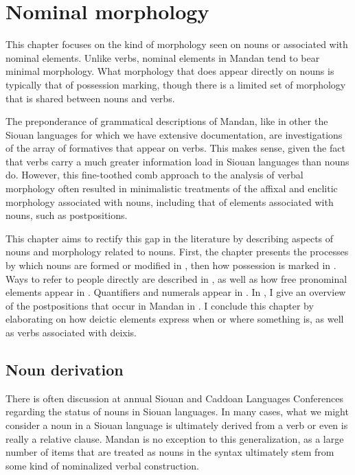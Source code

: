 \chapter{Nominal morphology}\label{chapter4}

This chapter focuses on the kind of morphology seen on nouns or associated with nominal elements. Unlike verbs, nominal elements in Mandan tend to bear minimal morphology. What morphology that does appear directly on nouns is typically that of possession marking, though there is a limited set of morphology that is shared between nouns and verbs.

The preponderance of grammatical descriptions of Mandan, like in other the Siouan languages for which we have extensive documentation, are investigations of the array of formatives that appear on verbs. This makes sense, given the fact that verbs carry a much greater information load in Siouan languages than nouns do. However, this fine-toothed comb approach to the analysis of verbal morphology often resulted in minimalistic treatments of the affixal and enclitic morphology associated with nouns, including that of elements associated with nouns, such as postpositions.

This chapter aims to rectify this gap in the literature by describing aspects of nouns and morphology related to nouns. First, the chapter presents the processes by which nouns are formed or modified in , then how possession is marked in . Ways to refer to people directly are described in , as well as how free pronominal elements appear in . Quantifiers and numerals appear in . In , I give an overview of the postpositions that occur in Mandan in .  I conclude this chapter by elaborating on how deictic elements express when or where something is, as well as verbs associated with deixis.

\section{Noun derivation}\label{SecNounDeriv}

There is often discussion at annual Siouan and Caddoan Languages Conferences regarding the status of nouns in Siouan languages. In many cases, what we might consider a noun in a Siouan language is ultimately derived from a verb or even is really a relative clause. Mandan is no exception to this generalization, as a large number of items that are treated as nouns in the syntax ultimately stem from some kind of nominalized verbal construction.

